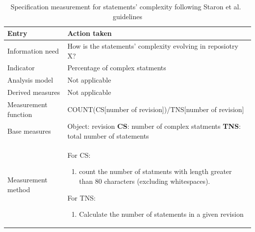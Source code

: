     \begin{table}[!htb]
		\centering
		\tabulinesep=1.2mm
		\begin{tabu} to \textwidth {|X|X[2]|}
			    
			\hline
			\textbf{Entry} & \textbf{Action taken} \\ 
			\hline
			
			Information need & How is the statements' complexity evolving in reposiotry X? \\
			\hline
			
			Indicator & Percentage of complex statments \\
			\hline
			
			Analysis model & Not applicable \\
			\hline
			
			Derived measures & Not applicable \\
			\hline
			
			Measurement function & COUNT(CS[number of revision])/TNS[number of revision] \\
			\hline
			
			Base measures & Object: revision \newline
			                    \textbf{CS}: number of complex statments \newline
			                    \textbf{TNS}: total number of statements \\
		    \hline
			
			Measurement method & For CS:
			    \begin{enumerate}
			    \item count the number of statments with length greater than 80 characters (excluding whitespaces).
			    \end{enumerate}
			
			For TNS:
			\begin{enumerate}
			\item Calculate the number of statements in a given revision
			\end{enumerate}
			
			\\
			\hline

				
		\end{tabu}
		\caption[Specification measurement for statements' complexity]
        {Specification measurement for statements' complexity following Staron et al.\ \cite{metrics_paper} guidelines}
        \label{tab:statements_measurement_system}
    \end{table}
    

